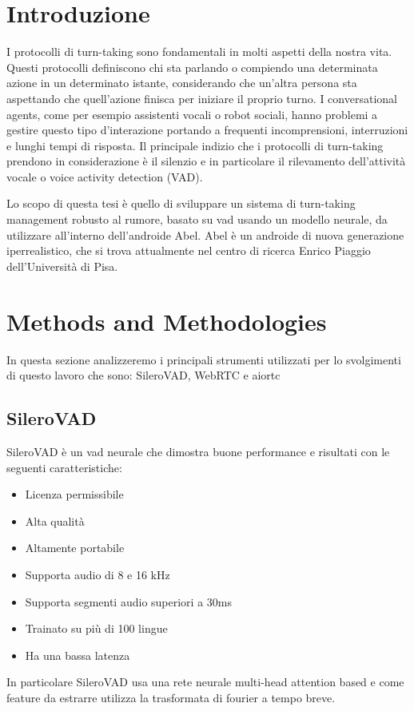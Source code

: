 \documentclass[12pt]{article}
\begin{document}
\section{Introduzione}

I protocolli di turn-taking sono fondamentali in molti aspetti della nostra vita. Questi protocolli definiscono chi sta parlando o compiendo una determinata azione in un determinato istante, considerando che un'altra persona sta aspettando che quell'azione finisca per iniziare il proprio turno. I conversational agents, come per esempio assistenti vocali o robot sociali, hanno problemi a gestire questo tipo d'interazione portando a frequenti incomprensioni, interruzioni e lunghi tempi di risposta. Il principale indizio che i protocolli di turn-taking prendono in considerazione è il silenzio e in particolare il rilevamento dell'attività vocale o voice activity detection (VAD).

Lo scopo di questa tesi è quello di sviluppare un sistema di turn-taking management robusto al rumore, basato su vad usando un modello neurale, da utilizzare all'interno dell'androide Abel. 
Abel è un androide di nuova generazione iperrealistico, che si trova attualmente nel centro di ricerca Enrico Piaggio dell'Università di Pisa.

\section{Methods and Methodologies}

In questa sezione analizzeremo i principali strumenti utilizzati per lo svolgimenti di questo lavoro che sono: SileroVAD, WebRTC e aiortc

\subsection{SileroVAD}

SileroVAD è un vad neurale che dimostra buone performance e risultati con le seguenti caratteristiche: 
\begin{itemize}
    \item Licenza permissibile
    \item Alta qualità
    \item Altamente portabile
    \item Supporta audio di 8 e 16 kHz
    \item Supporta segmenti audio superiori a 30ms
    \item Trainato su più di 100 lingue
    \item Ha una bassa latenza 
\end{itemize} 
In particolare SileroVAD usa una rete neurale multi-head attention based e come feature da estrarre utilizza la trasformata di fourier a tempo breve.
\end{document}
